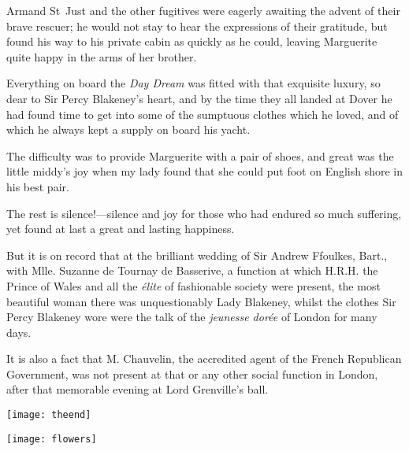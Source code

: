 Armand St~Just and the other fugitives were eagerly awaiting the advent of their brave rescuer; he would not stay to hear the expressions of their gratitude, but found his way to his private cabin as quickly as he could, leaving Marguerite quite happy in the arms of her brother.

Everything on board the \textit{Day Dream} was fitted with that exquisite luxury, so dear to Sir Percy Blakeney's heart, and by the time they all landed at Dover he had found time to get into some of the sumptuous clothes which he loved, and of which he always kept a supply on board his yacht.

The difficulty was to provide Marguerite with a pair of shoes, and great was the little middy's joy when my lady found that she could put foot on English shore in his best pair.

The rest is silence!—silence and joy for those who had endured so much suffering, yet found at last a great and lasting happiness.

But it is on record that at the brilliant wedding of Sir Andrew Ffoulkes, Bart., with Mlle. Suzanne de Tournay de Basserive, a function at which H.R.H. the Prince of Wales and all the \textit{élite} of fashionable society were present, the most beautiful woman there was unquestionably Lady Blakeney, whilst the clothes Sir Percy Blakeney wore were the talk of the \textit{jeunesse dorée} of London for many days.

It is also a fact that M. Chauvelin, the accredited agent of the French Republican Government, was not present at that or any other social function in London, after that memorable evening at Lord Grenville's ball.

\centering
\texttt{[image: theend]}
\clearpage

%
\centering
\texttt{[image: flowers]}
\label{flowers}
\thispagestyle{empty}
\clearpage